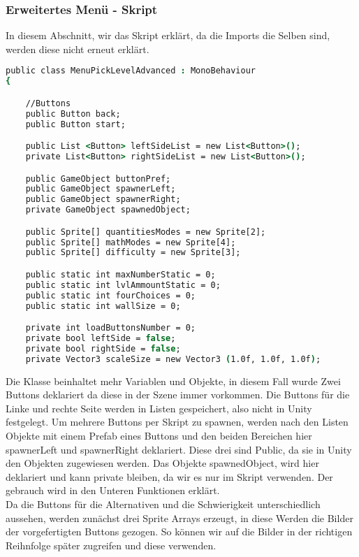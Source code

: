 \subsubsection{Erweitertes Menü - Skript}
In diesem Abschnitt, wir das Skript erklärt, da die Imports die Selben sind, werden diese nicht erneut erklärt.
\begin{lstlisting}[language=csh, caption={MenuPickLevelAdvanced.cs Variable Deklaration}]
public class MenuPickLevelAdvanced : MonoBehaviour
{

	//Buttons
	public Button back;
	public Button start;

	public List <Button> leftSideList = new List<Button>();
	private List<Button> rightSideList = new List<Button>();

	public GameObject buttonPref;
	public GameObject spawnerLeft;
	public GameObject spawnerRight;
	private GameObject spawnedObject;

	public Sprite[] quantitiesModes = new Sprite[2];
	public Sprite[] mathModes = new Sprite[4];
	public Sprite[] difficulty = new Sprite[3];

	public static int maxNumberStatic = 0;
	public static int lvlAmmountStatic = 0;
	public static int fourChoices = 0;
	public static int wallSize = 0;

	private int loadButtonsNumber = 0;
	private bool leftSide = false;
	private bool rightSide = false;
	private Vector3 scaleSize = new Vector3 (1.0f, 1.0f, 1.0f);
\end{lstlisting}
Die Klasse beinhaltet mehr Variablen und Objekte, in diesem Fall wurde Zwei Buttons deklariert da diese in der Szene immer vorkommen. Die Buttons für die Linke und rechte Seite werden in Listen gespeichert, also nicht in Unity festgelegt. Um mehrere Buttons per Skript zu spawnen, werden nach den Listen Objekte mit einem Prefab eines Buttons und den beiden Bereichen hier spawnerLeft und spawnerRight deklariert. Diese drei sind Public, da sie in Unity den Objekten zugewiesen werden. Das Objekte spawnedObject, wird hier deklariert und kann private bleiben, da wir es nur im Skript verwenden. Der gebrauch wird in den Unteren Funktionen erklärt.\\
Da die Buttons für die Alternativen und die Schwierigkeit unterschiedlich aussehen, werden zunächst drei Sprite Arrays erzeugt, in diese Werden die Bilder der vorgefertigten Buttons gezogen. So können wir auf die Bilder in der richtigen Reihnfolge später zugreifen und diese verwenden.\\
